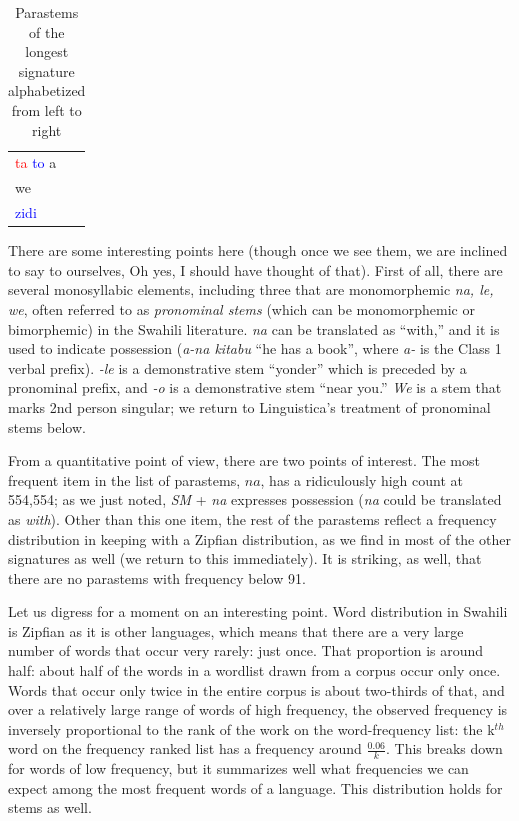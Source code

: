\documentclass[output=paper,colorlinks,citecolor=brown,
]{langscibook}
\begin{document}
\begin{table}
\begin{minipage}{.24\textwidth}
\begin{tabular}{ll}
\textcolor{red}{ta} \textcolor{blue}{to} a   \\ 
we   \\
\textcolor{blue}{zidi}  \\ 
\end{tabular}
\end{minipage}
\lspbottomrule
\caption{Parastems of the longest signature alphabetized from left to right}
\label{stems-alphabetized-1}
\end{table} 
 


 


There are some interesting points here (though once we see them, we are inclined to say to ourselves, Oh yes, I should have thought of that). First of all, there are several monosyllabic elements, including three that are monomorphemic \textit{na, le, we}, often referred to as \textit{pronominal stems} (which can be monomorphemic or bimorphemic) in the Swahili literature. \textit{na} can be translated as ``with,'' and it is used to indicate possession (\textit{a-na kitabu} ``he has a book'', where \textit{a-} is the Class 1 verbal prefix). \textit{-le} is a demonstrative stem ``yonder'' which is preceded by a pronominal prefix,  and \textit{-o} is a demonstrative stem ``near you.'' \textit{We} is a stem that marks 2nd person singular; we return to Linguistica's treatment of pronominal stems below. 

From a quantitative point of view, there are two points of interest. The most frequent item in the list of parastems, $na$, has a ridiculously high count at 554,554; as we just noted, \textit{SM} + \textit{na} expresses possession (\textit{na} could be translated as \textit{with}). Other than this one item, the rest of the parastems reflect a frequency distribution in keeping with a Zipfian distribution, as we find in most of the other signatures as well (we return to this immediately). It is striking, as well, that there are no parastems with frequency below 91. 

Let us digress for a moment on an interesting point. Word distribution in Swahili is Zipfian as it is other languages, which means that there are a very large number of words that occur very rarely: just once. That proportion is around half: about half of the words in a wordlist drawn from a corpus occur only once. Words that occur only twice in the entire corpus is about two-thirds of that, and over a relatively large range of words of high frequency, the observed frequency is inversely proportional to the rank of the work on the word-frequency list: the k$^{th}$ word on the frequency ranked list has a frequency around $\frac{0.06}{k}$. This breaks down for words of low frequency, but it summarizes well what frequencies we can expect among the most frequent words of a language. This distribution holds for stems as well. 
\end{document}
